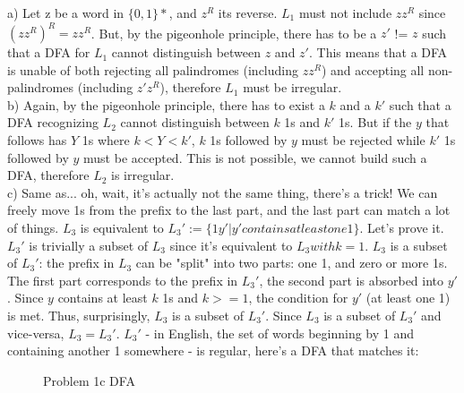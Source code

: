 
a) Let z be a word in $\{0, 1\}*$, and $z^R$ its reverse. $L_1$ must not include $zz^R$ since $(zz^R)^R = zz^R$. 
But, by the pigeonhole principle, there has to be a $z'$ != $z$ such that a DFA for $L_1$ cannot distinguish between $z$ and $z'$. 
This means that a DFA is unable of both rejecting all palindromes (including $zz^R$) and accepting all non-palindromes (including $z'z^R$), therefore $L_1$ must be irregular. \\

b) Again, by the pigeonhole principle, there has to exist a $k$ and a $k'$ such that a DFA recognizing $L_2$ cannot distinguish between $k$ 1s and $k'$ 1s. 
But if the $y$ that follows has $Y$ 1s where $k < Y < k'$, $k$ 1s followed by $y$ must be rejected while $k'$ 1s followed by $y$ must be accepted.
This is not possible, we cannot build such a DFA, therefore $L_2$ is irregular. \\

c) Same as... oh, wait, it's actually not the same thing, there's a trick!
We can freely move 1s from the prefix to the last part, and the last part can match a lot of things. $L_3$ is equivalent to $L_3' := \{ 1y' | y' contains at least one 1 \}$. Let's prove it.
$L_3'$ is trivially a subset of $L_3$ since it's equivalent to $L_3 with k = 1$.
$L_3$ is a subset of $L_3'$: the prefix in $L_3$ can be "split" into two parts: one 1, and zero or more 1s. The first part corresponds to the prefix in $L_3'$, the second part is absorbed into $y'$.
Since $y$ contains at least $k$ 1s and $k >= 1$, the condition for $y'$ (at least one 1) is met. Thus, surprisingly, $L_3$ is a subset of $L_3'$.
Since $L_3$ is a subset of $L_3'$ and vice-versa, $L_3 = L_3'$.
$L_3'$ - in English, the set of words beginning by 1 and containing another 1 somewhere - is regular, here's a DFA that matches it:

\begin{figure}[H]
\centering
{}
\caption{Problem 1c DFA}
\end{figure}
